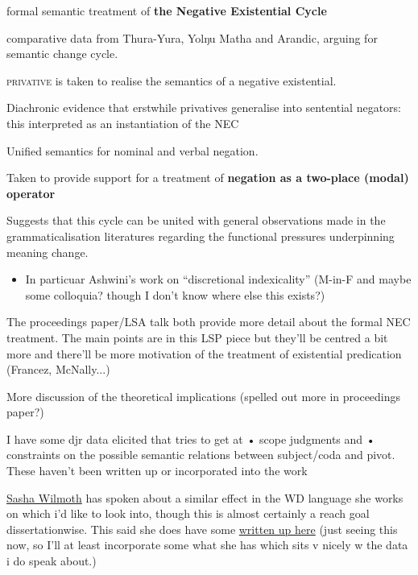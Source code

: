 \documentclass[11pt,dvipsnames]{article}
\begin{document}
\begin{description}
\begin{itemize}
	\item 	formal semantic treatment of \textbf{the Negative Existential Cycle}
	\item comparative data from Thura-Yura, Yolŋu Matha and Arandic, arguing for semantic change cycle. 
	\item  \textsc{privative} is taken to realise the semantics of a negative existential. 
	\item Diachronic evidence that erstwhile privatives generalise into sentential negators: this interpreted as an instantiation of the NEC
	\item Unified semantics for nominal and verbal negation.
	\item Taken to provide support for a treatment of \textbf{negation as a two-place (modal) operator} 
	\item Suggests that this cycle can be united with general observations made in the grammaticalisation literatures regarding the functional pressures underpinning meaning change.
	\begin{itemize}
		\item In particuar Ashwini's work on ``discretional indexicality'' (M-in-F and maybe some colloquia? though I don't know where else this exists?)
	\end{itemize}
	
	{\color{violet} \item The proceedings paper/LSA talk both provide more detail about the formal NEC treatment. The main points are in this LSP piece but they'll be centred a bit more and there'll be more motivation of the treatment of existential predication (Francez, McNally...)
	\item  More discussion of the theoretical implications (spelled out more in proceedings paper?)
	\item I have some djr data elicited that tries to get at • scope judgments and • constraints on the possible semantic relations between subject/coda and pivot. These haven't been written up or incorporated into the work
	\item \href{https://sashawilmoth.com/}{Sasha Wilmoth} has spoken about a similar effect in the WD language she works on which i'd like to look into, though this is almost certainly a reach goal dissertationwise. This said she does have some \href{https://sashawilmoth.files.wordpress.com/2020/07/wilmoth_alw2020_negation.pdf}{written up here} (just seeing this now, so I'll at least incorporate some what she has which sits v nicely w the data i do speak about.)}



\end{itemize}
\end{description}
\end{document}
